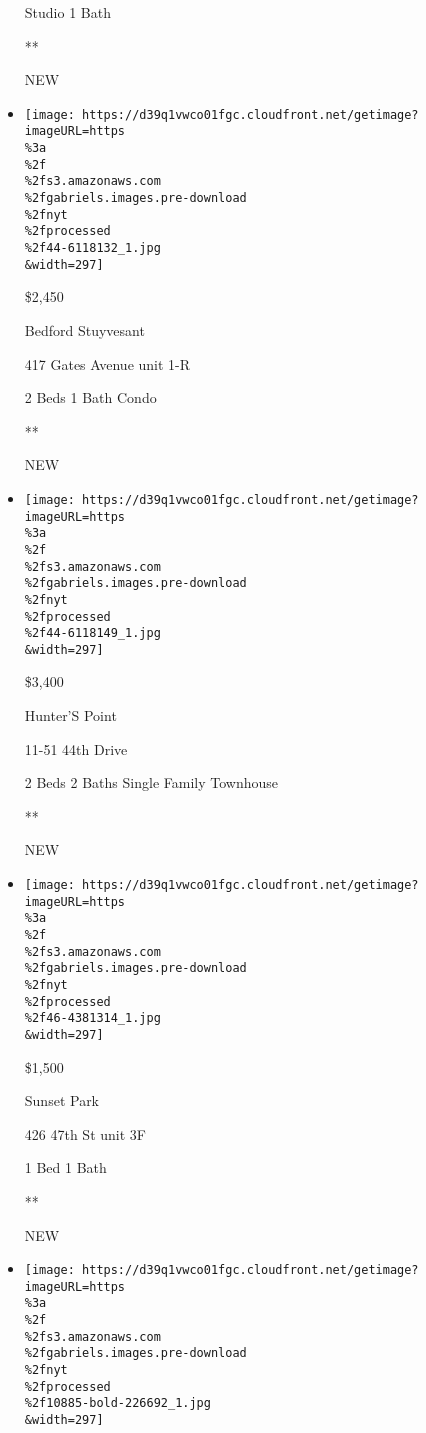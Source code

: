 \begin{itemize}
  Studio \textbar{} 1 Bath \textbar{}

  **

  NEW
\item
  \href{/real-estate/usa/ny/brooklyn/bedford-stuyvesant/homes-for-rent/417-gates-avenue/44-6118132?}{}

  \texttt{[image: https://d39q1vwco01fgc.cloudfront.net/getimage?imageURL=https\\\%3a\\\%2f\\\%2fs3.amazonaws.com\\\%2fgabriels.images.pre-download\\\%2fnyt\\\%2fprocessed\\\%2f44-6118132\_1.jpg\\\&width=297]}

  \$2,450

  Bedford Stuyvesant

  417 Gates Avenue unit 1-R

  2 Beds \textbar{} 1 Bath \textbar{} Condo

  **

  NEW
\item
  \href{/real-estate/usa/ny/queens/hunters-point/homes-for-rent/11-51-44th-drive/44-6118149?}{}

  \texttt{[image: https://d39q1vwco01fgc.cloudfront.net/getimage?imageURL=https\\\%3a\\\%2f\\\%2fs3.amazonaws.com\\\%2fgabriels.images.pre-download\\\%2fnyt\\\%2fprocessed\\\%2f44-6118149\_1.jpg\\\&width=297]}

  \$3,400

  Hunter'S Point

  11-51 44th Drive

  2 Beds \textbar{} 2 Baths \textbar{} Single Family Townhouse

  **

  NEW
\item
  \href{/real-estate/usa/ny/brooklyn/sunset-park/homes-for-rent/426-47th-st/46-4381314?}{}

  \texttt{[image: https://d39q1vwco01fgc.cloudfront.net/getimage?imageURL=https\\\%3a\\\%2f\\\%2fs3.amazonaws.com\\\%2fgabriels.images.pre-download\\\%2fnyt\\\%2fprocessed\\\%2f46-4381314\_1.jpg\\\&width=297]}

  \$1,500

  Sunset Park

  426 47th St unit 3F

  1 Bed \textbar{} 1 Bath \textbar{}

  **

  NEW
\item
  \href{/real-estate/usa/ny/new-york/midtown-east/homes-for-rent/227-e-57th-st/10885-BOLD-226692?}{}

  \texttt{[image: https://d39q1vwco01fgc.cloudfront.net/getimage?imageURL=https\\\%3a\\\%2f\\\%2fs3.amazonaws.com\\\%2fgabriels.images.pre-download\\\%2fnyt\\\%2fprocessed\\\%2f10885-bold-226692\_1.jpg\\\&width=297]}


\end{itemize}
